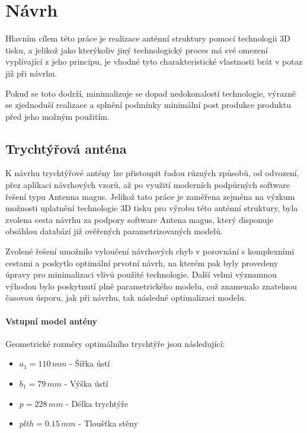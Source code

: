 \chapter{Návrh}
Hlavním cílem této práce je realizace anténní struktury pomocí technologii 3D tisku, a jelikož jako kterýkoliv jiný technologický proces má své omezení vyplívající z jeho principu, je vhodné tyto charakteristické vlastnosti brát v potaz již při návrhu.

Pokud se toto dodrží, minimalizuje se dopad nedokonalostí technologie, výrazně se zjednoduší realizace a splnění podmínky minimální post produkce produktu před jeho možným použitím.

\section{Trychtýřová anténa}
K návrhu trychtýřové antény lze přistoupit řadou různých způsobů, od odvození, přez aplikaci návrhových vzorů, až po využití moderních podpůrných software řešení typu Antenna magus. Jelikož tato práce je zaměřena zejména na výzkum možnosti uplatnění technologie 3D tisku pro výrobu této anténní struktury, byla zvolena cesta návrhu za podpory software Antena magus, který disponuje obsáhlou databází již ověřených parametrizovaných modelů.

Zvolené řešení umožnilo vyloučení návrhových chyb v porovnání s komplexními cestami a poskytlo optimální prvotní návrh, na kterém pak byly provedeny úpravy pro minimalizaci vlivů použité technologie. Další velmi významnou výhodou bylo poskytnutí plně parametrického modelu, což znamenalo znatelnou časovou úsporu, jak při návrhu, tak následné optimalizaci modelu.
\subsubsection{Vstupní model antény}
Geometrické rozměry optimálního trychtýře jsou následující:
\begin{itemize}
\item $a_1 = 110\,mm$ - Šířka ústí
\item $b_1 = 79\,mm$ - Výška ústí
\item $p = 228\,mm$ - Délka trychtýře
\item $plth = 0.15\,mm$ - Tloušťka stěny
\end{itemize}

